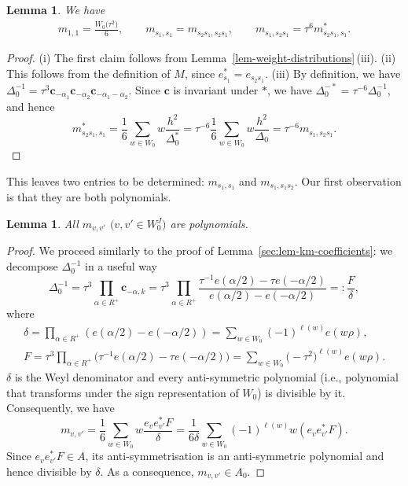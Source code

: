 \documentclass[10pt,a4paper]{amsart}
\newtheorem{Lemma}[Theorem]{Lemma}
\theoremstyle{definition}
\numberwithin{equation}{section}
\begin{document}
\begin{Lemma}
 We have
 \begin{align*}
 m_{1,1} = \frac{W_0\bigl(\tau^2\bigr)}{6},\qquad
 m_{s_1,s_1} = m_{s_2s_1,s_2s_1},\qquad
 m_{s_1,s_2s_1} = \tau^6 m_{s_2s_1,s_1}^*.
 \end{align*}
\end{Lemma}
\begin{proof} (i) The first claim follows from Lemma~\ref{lem-weight-distributions}\,(iii).
(ii) This follows from the definition of $M$, since $e_{s_1}^*=e_{s_2s_1}$.
(iii) By definition, we have
$
 \Delta_0^{-1} = \tau^3 \bm{c}_{-\alpha_1}\bm{c}_{-\alpha_2}\bm{c}_{-\alpha_1-\alpha_2}$.
 Since $\bm{c}$ is invariant under $*$, we have
 $\Delta_0^{-*} = \tau^{-6} \Delta_0^{-1}$, and hence
 \[
 m_{s_2s_1,s_1}^* = \frac{1}{6}\sum_{w\in W_0}
 w \frac{h^2}{\Delta_0^*}
 = \tau^{-6} \frac{1}{6}\sum_{w\in W_0} w\frac{h^2}{\Delta_0}
 = \tau^{-6} m_{s_1,s_2s_1}.\tag*{\qed}
 \]
\renewcommand{\qed}{}
\end{proof}

This leaves two entries to be determined: $m_{s_1,s_1}$ and $m_{s_1,s_1s_2}$. Our first
observation is that they are both polynomials.

\begin{Lemma}\label{sec:lem-shi-polynomial-weight}
 All $m_{v,v'}$ $\big(v,v'\in W_0^J\big)$ are polynomials.
\end{Lemma}
\begin{proof}
 We proceed similarly to the proof of Lemma~\ref{sec:lem-km-coefficients}: we
 decompose $\Delta_0^{-1}$ in a useful way
 \[
 \Delta_0^{-1} = \tau^3 \prod_{\alpha\in R^+} \bm{c}_{-\alpha,k}
 = \tau^3 \prod_{\alpha\in R^+} \frac{\tau^{-1} e(\alpha/2)-\tau e(-\alpha/2)}{e(\alpha/2)-e(-\alpha/2)}
 =: \frac{F}{\delta},
 \]
 where
 \begin{gather*}
 \delta = \prod_{\alpha\in R^+} (e(\alpha/2)-e(-\alpha/2))= \sum_{w\in W_0} (-1)^{\ell(w)} e(w\rho),\\
F = \tau^3\prod_{\alpha\in R^+} \bigl(\tau^{-1}e(\alpha/2) - \tau e(-\alpha/2)\bigr)= \sum_{w\in W_0} \bigl(-\tau^2\bigr)^{\ell(w)} e(w\rho).
 \end{gather*}
 $\delta$ is the Weyl denominator and every anti-symmetric polynomial (i.e.,
 polynomial that transforms under the sign representation of $W_0$) is divisible by
 it. Consequently, we have
 \[
 m_{v,v'} = \frac{1}{6}\sum_{w\in W_0} w \frac{e_v e_{v'}^* F}{\delta}
 = \frac{1}{6\delta} \sum_{w\in W_0} (-1)^{\ell(w)} w (e_v e_{v'}^* F).
 \]
 Since $e_ve_{v'}^* F\in A$, its anti-symmetrisation is an anti-symmetric polynomial
 and hence divisible by $\delta$. As a consequence, $m_{v,v'}\in A_0$.
\end{proof}
\end{document}
